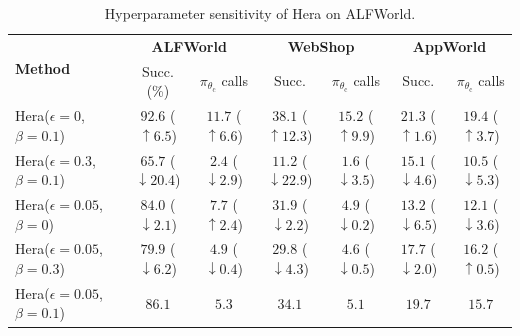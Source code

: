 \documentclass{article}
\newcommand{\name}{Hera\xspace}
\begin{document}
\begin{table}[h]
\centering
\caption{Hyperparameter sensitivity of \name on ALFWorld.}
\vspace{1mm}
\scriptsize
\renewcommand{\arraystretch}{0.95}
\begin{tabular}{l cc | cc | cc}
\toprule
\multirow{2}{*}{\textbf{Method}} 
& \multicolumn{2}{c|}{\textbf{ALFWorld}} 
& \multicolumn{2}{c|}{\textbf{WebShop}} 
& \multicolumn{2}{c}{\textbf{AppWorld}} \\
& Succ. (\%) & $\pi_{\theta_\mathrm{c}}$ calls
& Succ. & $\pi_{\theta_\mathrm{c}}$ calls 
& Succ. & $\pi_{\theta_\mathrm{c}}$ calls \\
\midrule
\name ($\epsilon=0$, $\beta=0.1$) & $92.6$ (\textcolor{green!50!black}{$\uparrow6.5$})
         & $11.7$ (\textcolor{red!70!black}{$\uparrow6.6$})  & $38.1$ (\textcolor{green!50!black}{$\uparrow12.3$})
         & $15.2$ (\textcolor{red!70!black}{$\uparrow9.9$}) & $21.3$ (\textcolor{green!50!black}{$\uparrow1.6$})
         & $19.4$ (\textcolor{red!70!black}{$\uparrow3.7$}) \\
\name ($\epsilon=0.3$, $\beta=0.1$) & $65.7$ (\textcolor{red!70!black}{$\downarrow20.4$})
         & $2.4$ (\textcolor{green!50!black}{$\downarrow2.9$})   & $11.2$ (\textcolor{red!70!black}{$\downarrow22.9$})
         & $1.6$ (\textcolor{green!50!black}{$\downarrow3.5$}) & $15.1$ (\textcolor{red!70!black}{$\downarrow4.6$})
         & $10.5$ (\textcolor{green!50!black}{$\downarrow5.3$}) \\
\name ($\epsilon=0.05$, $\beta=0$) & $84.0$ (\textcolor{red!70!black}{$\downarrow2.1$})  %
         & $7.7$ (\textcolor{red!70!black}{$\uparrow2.4$})  & $31.9$ (\textcolor{red!70!black}{$\downarrow2.2$})  %
         & $4.9$ (\textcolor{green!50!black}{$\downarrow0.2$}) & $13.2$ (\textcolor{red!70!black}{$\downarrow6.5$})  %
         & $12.1$ (\textcolor{red!70!black}{$\downarrow3.6$})   \\
\name ($\epsilon=0.05$, $\beta=0.3$)  &$79.9$ (\textcolor{red!70!black}{$\downarrow6.2$})  %
         & $4.9$ (\textcolor{green!50!black}{$\downarrow0.4$})  & $29.8$ (\textcolor{red!70!black}{$\downarrow4.3$})  %
         & $4.6$ (\textcolor{green!50!black}{$\downarrow0.5$}) & $17.7$ (\textcolor{red!70!black}{$\downarrow2.0$})  %
         & $16.2$ (\textcolor{red!70!black}{$\uparrow0.5$})  \\
\cellcolor{blue!10}\name ($\epsilon=0.05$, $\beta=0.1$)
         & \cellcolor{blue!10}$86.1$ 
         & \cellcolor{blue!10}$5.3$  & \cellcolor{blue!10}$34.1$
         & \cellcolor{blue!10}$5.1$ & \cellcolor{blue!10}$19.7$ & \cellcolor{blue!10}$15.7$ \\
\bottomrule
\end{tabular}
\label{table:hyper}
\end{table}
\end{document}
